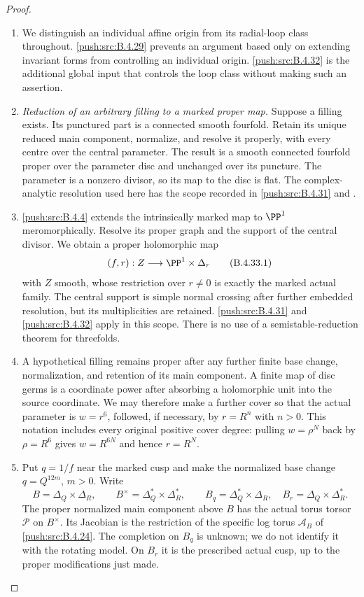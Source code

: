 \begin{proof}
\begin{enumerate}[label=\arabic*.,leftmargin=*]
\item We distinguish an individual affine origin from its
radial-loop class throughout. \ref{push:src:B.4.29} prevents an
argument based only on extending invariant forms
from controlling an individual origin. \ref{push:src:B.4.32} is
the additional global input that controls the loop
class without making such an assertion.

\item \emph{Reduction of an arbitrary filling to a marked proper map.}
Suppose a filling exists. Its punctured part is a
connected smooth fourfold. Retain its unique reduced
main component, normalize, and resolve it properly,
with every centre over the central parameter. The
result is a smooth connected fourfold proper over
the parameter disc and unchanged over its puncture.
The parameter is a nonzero divisor, so its map to
the disc is flat. The complex-analytic resolution
used here has the scope recorded in \ref{push:src:B.4.31} and
\citet[Theorems 1.6 and 1.10]{BM95AB}.

\item \ref{push:src:B.4.4} extends the intrinsically marked map to
$\PP^1$ meromorphically. Resolve its proper graph
and the support of the central divisor. We obtain
a proper holomorphic map
\[
 (f,r):Z\longrightarrow\PP^1\times\Delta_r
 \tag{B.4.33.1}
\]
with $Z$ smooth, whose restriction over $r\ne0$
is exactly the marked actual family. The central
support is simple normal crossing after further
embedded resolution, but its multiplicities are
retained. \ref{push:src:B.4.31} and \ref{push:src:B.4.32} apply in this scope.
There is no use of a semistable-reduction theorem
for threefolds.

\item A hypothetical filling remains proper after any
further finite base change, normalization, and
retention of its main component. A finite map of
disc germs is a coordinate power after absorbing
a holomorphic unit into the source coordinate.
We may therefore make a further cover so that
the actual parameter is $w=r^6$, followed, if
necessary, by $r=R^n$ with $n>0$. This notation
includes every original positive cover degree:
pulling $w=\rho^N$ back by $\rho=R^6$ gives
$w=R^{6N}$ and hence $r=R^N$.

\item Put $q=1/f$ near the marked cusp and make the
normalized base change $q=Q^{12m}$, $m>0$.
Write
\[
 B=\Delta_Q\times\Delta_R,\qquad
 B^\times=\Delta_Q^*\times\Delta_R^*,\qquad
 B_q=\Delta_Q^*\times\Delta_R,\quad
 B_r=\Delta_Q\times\Delta_R^*.
 \tag{B.4.33.2}
\]
The proper normalized main component above $B$
has the actual torus torsor $\mathscr P$ on
$B^\times$. Its Jacobian is the restriction of
the specific log torus $\mathcal A_B$ of
\ref{push:src:B.4.24}. The completion on $B_q$ is unknown;
we do not identify it with the rotating model.
On $B_r$ it is the prescribed actual cusp,
up to the proper modifications just made.


\end{enumerate}
\end{proof}
